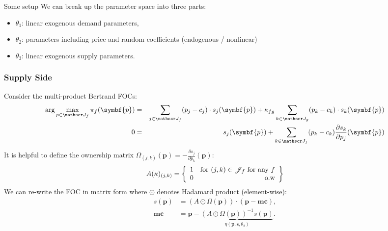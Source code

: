 \documentclass[aspectratio=169,11pt]{beamer}
\begin{document}
\begin{frame}{Some setup}
We can break up the parameter space into three parts:
\begin{itemize}
\item $\theta_1$: linear exogenous demand parameters, 
 \item $\theta_2$: parameters including price and random coefficients (endogenous / nonlinear)
 \item $\theta_3$: linear exogenous supply parameters.
\end{itemize}
\end{frame}



\begin{frame}[plain]
\frametitle{Supply Side}
Consider the multi-product Bertrand FOCs:
\footnotesize
{\begin{eqnarray*}
\arg \max_{p \in \calJ_f} \pi_f (\symbf{p}) &=& \sum_{j \in \calJ_f} (p_j - c_j) \cdot s_j(\symbf{p}) +  \kappa_{fg}\sum_{k \in \calJ_g} (p_k - c_k) \cdot s_k(\symbf{p}) \\
0&=& s_j(\symbf{p}) + \sum_{k \in \calJ_f} (p_k - c_k) \frac{\partial s_{k}}{\partial p_j}(\symbf{p}) 
\end{eqnarray*}
}
It is helpful to define the \alert{ownership matrix} $\Omega_{(j,k)}(\symbf{p})  = - \frac{\partial s_{j}}{\partial p_k}(\symbf{p})$:
\begin{eqnarray*}
A(\kappa)_{(j,k)} = \left\{\begin{array}{lr}
          1 & \text{for }  (j,k) \in \mathscr{J}_f \text{ for any } f \\ 
	  0 & \text{o.w}\\
        \end{array} \right\}
\end{eqnarray*}
We can re-write the FOC in matrix form where $\odot$ denotes Hadamard product (element-wise):
\begin{eqnarray*}
        s(\symbf{p}) &= (A \odot \Omega(\symbf{p})) \cdot (\symbf{p} - \symbf{mc}), \\
       \symbf{mc} &=  \symbf{p} - \underbrace{(A \odot \Omega(\symbf{p}))^{-1} s(\symbf{p})}_{\eta(\symbf{p},\symbf{s},\theta_2)}.
\end{eqnarray*}
\end{frame}
\end{document}
